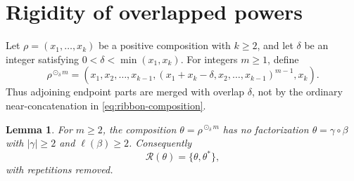 \documentclass[11pt,a4paper]{amsart}
\numberwithin{equation}{section}
\theoremstyle{plain}
\newtheorem{lemma}[theorem]{Lemma}
\theoremstyle{definition}
\begin{document}
\section{Rigidity of overlapped powers}\label{sec:overlap-powers}

Let \(\rho=(x_1,\ldots,x_k)\) be a positive composition with
\(k\ge2\), and let \(\delta\) be an integer satisfying
\(0<\delta<\min(x_1,x_k)\).  For integers \(m\ge1\), define
\[
 \rho^{\odot_\delta m}
 =(x_1,x_2,\ldots,x_{k-1},
   (x_1+x_k-\delta,x_2,\ldots,x_{k-1})^{m-1},x_k).
\]
Thus adjoining endpoint parts are merged with overlap \(\delta\),
not by the ordinary near-concatenation in \eqref{eq:ribbon-composition}.

\begin{lemma}\label{lem:overlap-power-rigidity}
For \(m\ge2\), the composition
\(\theta=\rho^{\odot_\delta m}\) has no factorization
\(\theta=\gamma\circ\beta\) with \(|\gamma|\ge2\) and
\(\ell(\beta)\ge2\).  Consequently
\[
 \mathcal R(\theta)=\{\theta,\theta^*\},
\]
with repetitions removed.
\end{lemma}
\end{document}
